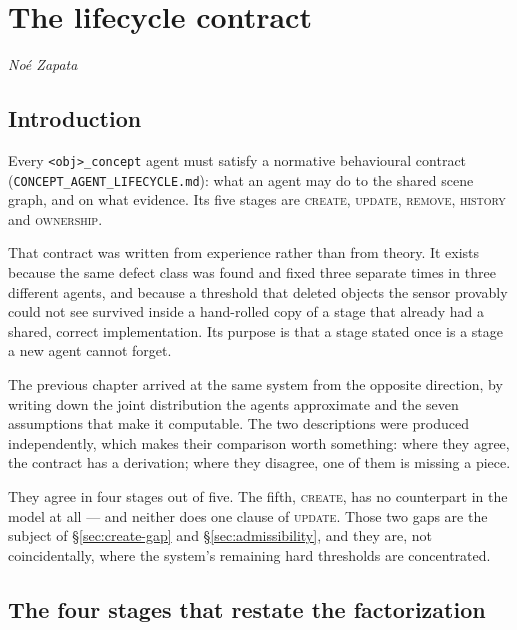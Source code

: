 \documentclass[11pt,a4paper]{report}
\begin{document}
\setcounter{chapter}{2}
\chapter{The lifecycle contract}

\begin{flushleft}
\textit{No\'e Zapata}
\end{flushleft}

\vspace{4pt}

\section{Introduction}

Every \texttt{<obj>\_concept} agent must satisfy a normative behavioural contract
(\texttt{CONCEPT\_\allowbreak AGENT\_\allowbreak LIFECYCLE.md}): what an agent may do to the shared
scene graph, and on
what evidence. Its five stages are \textsc{create}, \textsc{update}, \textsc{remove},
\textsc{history} and \textsc{ownership}.

That contract was written from experience rather than from theory. It exists because the same
defect class was found and fixed three separate times in three different agents, and because a
threshold that deleted objects the sensor provably could not see survived inside a hand-rolled
copy of a stage that already had a shared, correct implementation. Its purpose is that a stage
stated once is a stage a new agent cannot forget.

The previous chapter arrived at the same system from the opposite direction, by writing down the
joint distribution the agents approximate and the seven assumptions that make it computable. The
two descriptions were produced independently, which makes their comparison worth something: where
they agree, the contract has a derivation; where they disagree, one of them is missing a piece.

They agree in four stages out of five. The fifth, \textsc{create}, has no counterpart in the model
at all --- and neither does one clause of \textsc{update}. Those two gaps are the subject of
\S\ref{sec:create-gap} and \S\ref{sec:admissibility}, and they are, not coincidentally, where the
system's remaining hard thresholds are concentrated.

\section{The four stages that restate the factorization}
\end{document}
